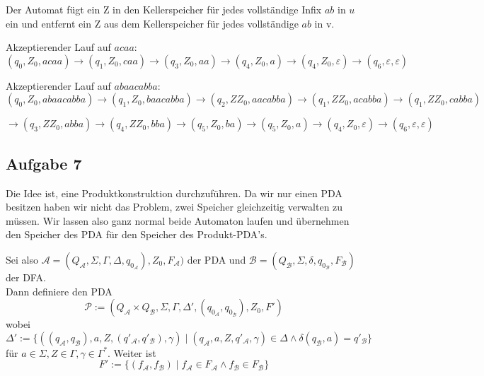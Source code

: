\documentclass[a4paper,graphics,11pt]{article}
\newcommand{\aufgabe}[1]{\subsection*{Aufgabe #1}}
\begin{document}
Der Automat fügt ein Z in den Kellerspeicher für jedes vollständige Infix $ab$ in $u$ ein und entfernt ein Z aus dem Kellerspeicher für jedes vollständige $ab$ in v.

Akzeptierender Lauf auf $acaa$:\\
$(q_0,Z_0,acaa)\rightarrow(q_1,Z_0,caa)\rightarrow(q_3,Z_0,aa)\rightarrow(q_4,Z_0,a)\rightarrow(q_4,Z_0,\varepsilon)\rightarrow(q_6,\varepsilon,\varepsilon)$

Akzeptierender Lauf auf $abaacabba$:\\
$(q_0,Z_0,abaacabba)\rightarrow(q_1,Z_0,baacabba)\rightarrow(q_2,ZZ_0,aacabba)\rightarrow(q_1,ZZ_0,acabba)\rightarrow(q_1,ZZ_0,cabba)$

$\rightarrow(q_3,ZZ_0,abba)\rightarrow(q_4,ZZ_0,bba)\rightarrow(q_5,Z_0,ba)\rightarrow(q_5,Z_0,a)\rightarrow(q_4,Z_0,\varepsilon)\rightarrow(q_6,\varepsilon,\varepsilon)$



\newpage

\aufgabe{7}
Die Idee ist, eine Produktkonstruktion durchzuführen. Da wir nur einen PDA besitzen haben wir nicht das Problem,
zwei Speicher gleichzeitig verwalten zu müssen. Wir lassen also ganz normal beide Automaton laufen
und übernehmen den Speicher des PDA für den Speicher des Produkt-PDA's.

Sei also $\mathcal{A} = (Q_\mathcal{A}, \Sigma, \Gamma, \Delta, q_{0_\mathcal{A}}), Z_0, F_\mathcal{A})$
der PDA
und $\mathcal{B} = (Q_\mathcal{B}, \Sigma, \delta, q_{0_\mathcal{B}}, F_\mathcal{B})$ der DFA.\\
Dann definiere den PDA
$$
    \mathcal{P} := (Q_\mathcal{A} \times Q_\mathcal{B}, \Sigma, \Gamma, \Delta', (q_{0_\mathcal{A}}, q_{0_\mathcal{B}}), Z_0, F')
$$
wobei
$$
    \Delta' := \{((q_\mathcal{A}, q_\mathcal{B}), a, Z, (q'_\mathcal{A}, q'_\mathcal{B}), \gamma)
    \mid (q_\mathcal{A}, a, Z, q'_\mathcal{A}, \gamma) \in \Delta \land \delta(q_\mathcal{B}, a) = q'_\mathcal{B}\}
$$
für $a \in \Sigma, Z \in \Gamma, \gamma \in \Gamma^*$.
Weiter ist
$$
    F' := \{(f_\mathcal{A},f_\mathcal{B}) \mid f_\mathcal{A} \in F_\mathcal{A} \land f_\mathcal{B} \in F_\mathcal{B}\}
$$
\end{document}
